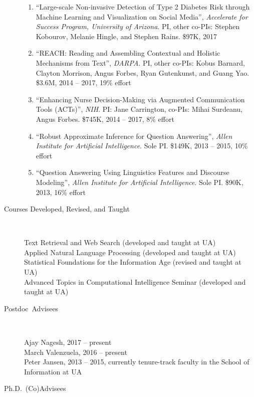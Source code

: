 \documentclass[10pt]{article}
\newcommand{\ve}[1]{{\em #1}} %
\newcommand{\ti}[1]{``#1''} %
\begin{document}
\begin{description}
\begin{enumerate}
\item \ti{Large-scale Non-invasive Detection of Type 2 Diabetes Risk through Machine Learning and Visualization on Social Media}, \ve{Accelerate for Success Program, University of Arizona}. PI, other co-PIs: Stephen Kobourov, Melanie Hingle, and Stephen Rains. \$97K, 2017

\item \ti{REACH: Reading and Assembling Contextual and Holistic Mechanisms from Text}, \ve{DARPA}. PI, other co-PIs: Kobus Barnard, Clayton Morrison, Angus Forbes, Ryan Gutenkunst, and Guang Yao. \$3.6M, 2014 -- 2017, 19\% effort

\item \ti{Enhancing Nurse Decision-Making via Augmented Communication Tools (ACTs)}, \ve{NIH}. PI: Jane Carrington, co-PIs: Mihai Surdeanu, Angus Forbes. \$745K, 2014 -- 2017, 8\% effort

\item \ti{Robust Approximate Inference for Question Answering}, \ve{Allen Institute for Artificial Intelligence}. Sole PI. \$149K, 2013 -- 2015, 10\% effort

\item \ti{Question Answering Using Linguistics Features and Discourse Modeling}, \ve{Allen Institute for Artificial Intelligence}. Sole PI. \$90K, 2013, 16\% effort

\end{enumerate}

\vspace{-.1cm}\item [Courses Developed, Revised, and Taught]\
	
Text Retrieval and Web Search (developed and taught at UA)\\
Applied Natural Language Processing  (developed and taught at UA)\\
Statistical Foundations for the Information Age (revised and taught at UA)\\
Advanced Topics in Computational Intelligence Seminar (developed and taught at UA)

\vspace{-.1cm}\item [Postdoc~Advisees]\

Ajay Nagesh, 2017 -- present\\
March Valenzuela, 2016 -- present\\
Peter Jansen, 2013 -- 2015, currently tenure-track faculty in the School of Information at UA

\vspace{-.1cm}\item [Ph.D.~(Co)Advisees]\


\end{description}
\end{document}

